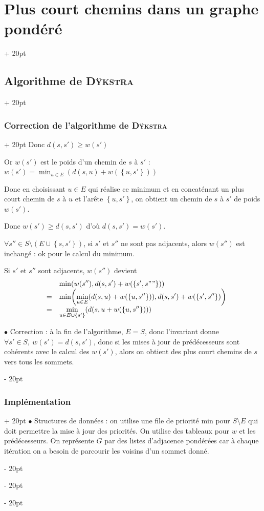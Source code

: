 \documentclass[a4paper, 12pt, twoside]{article}
\newcommand{\lr}[1]{\left( #1 \right)}
\newcommand{\set}[1]{\left\{ #1 \right\}}
\renewcommand{\ge}{\geqslant}
\newcommand{\ind}[1][20pt]{\advance\leftskip + #1}
\newcommand{\deind}[1][20pt]{\advance\leftskip - #1}
\newenvironment{indt}[2][20pt]{#2 \par \ind[#1]}{\par \deind} %
\begin{document}
\begin{indt}{\section{Plus court chemins dans un graphe pondéré}}
\begin{indt}{\subsection{Algorithme de \textsc{Dÿkstra}}}
\begin{indt}{\subsubsection{Correction de l'algorithme de \textsc{Dÿkstra}}}
                Donc $d(s, s') \ge w(s')$

                Or $w(s')$ est le poids d'un chemin de $s$ à $s'$ : $w(s') = \displaystyle \min_{u \in E}(d(s, u) + w(\set{u, s'}))$

                Donc en choisissant $u \in E$ qui réalise ce minimum et en concaténant un plus court chemin de $s$ à $u$ et l'arête $\set{u, s'}$, on obtient un chemin de $s$ à $s'$ de poids $w(s')$.

                Donc $w(s') \ge d(s, s')$ d'où $d(s, s') = w(s')$.

                \vspace{6pt}
                
                $\forall s'' \in S \setminus (E \cup \set{s, s'})$, si $s'$ et $s''$ ne sont pas adjacents, alors $w(s'')$ est inchangé : ok pour le calcul du minimum.

                Si $s'$ et $s''$ sont adjacents, $w(s'')$ devient
                \[
                    \begin{array}{rcl}
                        &&\displaystyle \min(w(s''), d(s, s') + w(\set{s', s""}))
                        \\
                        &=& \displaystyle \min\!\lr{\min_{u \in E}(d(s, u) + w(\set{u, s''})), d(s, s') + w(\set{s', s''})}
                        \\
                        &=& \displaystyle \min_{u \in E \cup \set{s'}} (d(s, u + w(\set{u, s''})))
                    \end{array}
                \]

                \vspace{6pt}
                
                $\bullet$ Correction : à la fin de l'algorithme, $E = S$, donc l'invariant donne $\forall s' \in S,\ w(s') = d(s, s')$, donc si les mises à jour de prédécesseurs sont cohérents avec le calcul des $w(s')$, alors on obtient des plus court chemins de $s$ vers tous les sommets.
            \end{indt}

            \vspace{12pt}
            
            \begin{indt}{\subsubsection{Implémentation}}
                $\bullet$ Structures de données : on utilise une file de priorité min pour $S \setminus E$ qui doit permettre la mise à jour des priorités. On utilise des tableaux pour $w$ et les prédécesseurs. On représente $G$ par des listes d'adjacence pondérées car à chaque itération on a besoin de parcourir les voisins d'un sommet donné.


\end{indt}
\end{indt}
\end{indt}
\end{document}

